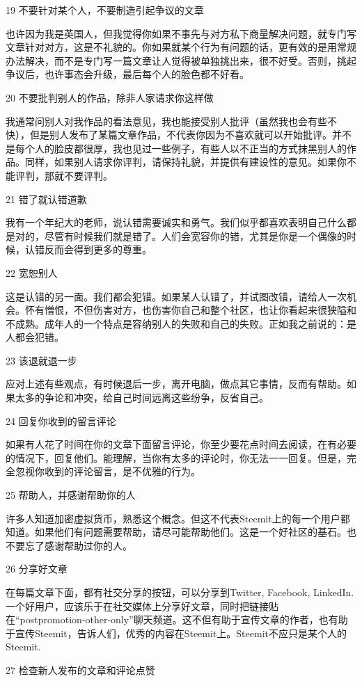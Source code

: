 \documentclass[]{ctexbook}
\begin{document}
19 不要针对某个人，不要制造引起争议的文章

也许因为我是英国人，但我觉得你如果不事先与对方私下商量解决问题，就专门写文章针对对方，这是不礼貌的。你如果就某个行为有问题的话，更有效的是用常规办法解决，而不是专门写一篇文章让人觉得被单独挑出来，很不好受。否则，挑起争议后，也许事态会升级，最后每个人的脸色都不好看。

20 不要批判别人的作品，除非人家请求你这样做

我通常问别人对我作品的看法意见，我也能接受别人批评（虽然我也会有些不快），但是别人发布了某篇文章作品，不代表你因为不喜欢就可以开始批评。并不是每个人的脸皮都很厚，我也见过一些例子，有些人以不正当的方式抹黑别人的作品。同样，如果别人请求你评判，请保持礼貌，并提供有建设性的意见。如果你不能评判，那就不要评判。

21 错了就认错道歉

我有一个年纪大的老师，说认错需要诚实和勇气。我们似乎都喜欢表明自己什么都是对的，尽管有时候我们就是错了。人们会宽容你的错，尤其是你是一个偶像的时候，认错反而会得到更多的尊重。

22 宽恕别人

这是认错的另一面。我们都会犯错。如果某人认错了，并试图改错，请给人一次机会。怀有憎恨，不但伤害对方，也伤害你自己和整个社区，也让你看起来很狭隘和不成熟。成年人的一个特点是容纳别人的失败和自己的失败。正如我之前说的：是人都会犯错。

23 该退就退一步

应对上述有些观点，有时候退后一步，离开电脑，做点其它事情，反而有帮助。如果太多的争论和冲突，给自己时间远离这些纷争，反省自己。

24 回复你收到的留言评论

如果有人花了时间在你的文章下面留言评论，你至少要花点时间去阅读，在有必要的情况下，回复他们。能理解，当你有太多的评论时，你无法一一回复。但是，完全忽视你收到的评论留言，是不优雅的行为。

25 帮助人，并感谢帮助你的人

许多人知道加密虚拟货币，熟悉这个概念。但这不代表Steemit上的每一个用户都知道。如果他们有问题需要帮助，请尽可能帮助他们。这是一个好社区的基石。也不要忘了感谢帮助过你的人。

26 分享好文章

在每篇文章下面，都有社交分享的按钮，可以分享到Twitter, Facebook, LinkedIn. 一个好用户，应该乐于在社交媒体上分享好文章，同时把链接贴在``postpromotion-other-only''聊天频道。这不但有助于宣传文章的作者，也有助于宣传Steemit，告诉人们，优秀的内容在Steemit上。Steemit不应只是某个人的Steemit.

27 检查新人发布的文章和评论点赞
\end{document}
